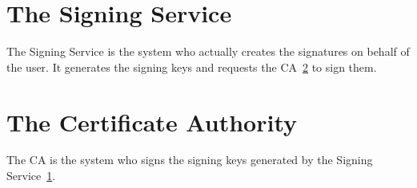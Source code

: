 \section{The Signing Service}
\label{sec:actorsigningservice}
The Signing Service is the system who actually creates the signatures on behalf of the user.
It generates the signing keys and requests the \gls{CA}~\ref{sec:actorca} to sign them.

\section{The Certificate Authority}
\label{sec:actorca}
The \gls{CA} is the system who signs the signing keys generated by the Signing Service~\ref{sec:actorsigningservice}.
